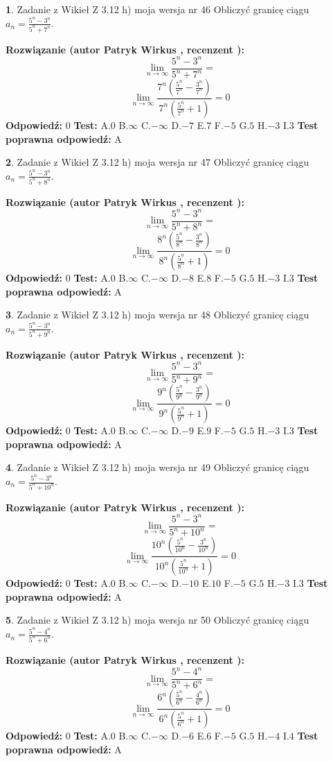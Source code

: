 \documentclass[12pt, a4paper]{article}
\theoremstyle{definition} %
\newtheorem{zad}{}
\newcommand{\zadStart}[1]{\begin{zad}#1\newline}
\newcommand{\zadStop}{\end{zad}}
\newcommand{\rozwStart}[2]{\noindent \textbf{Rozwiązanie (autor #1 , recenzent #2): }\newline}
\newcommand{\rozwStop}{\newline}
\newcommand{\odpStart}{\noindent \textbf{Odpowiedź:}\newline}
\newcommand{\odpStop}{\newline}
\newcommand{\testStart}{\noindent \textbf{Test:}\newline}
\newcommand{\testStop}{\newline}
\newcommand{\kluczStart}{\noindent \textbf{Test poprawna odpowiedź:}\newline}
\newcommand{\kluczStop}{\newline}
\begin{document}
\zadStart{Zadanie z Wikieł Z 3.12 h) moja wersja nr 46}
Obliczyć granicę ciągu $a_{n}=\frac{5^{n} - 3^{n}}{5^{n} + 7^{n}}$.
\zadStop
\rozwStart{Patryk Wirkus}{}
$$\lim\limits_{n\to\infty}\frac{5^{n} - 3^{n}}{5^{n} + 7^{n}}=$$
$$\lim\limits_{n\to\infty}\frac{7^{n}(\frac{5^{n}}{7^{n}} - \frac{3^{n}}{7^{n}})}{7^{n}(\frac{5^{n}}{7^{n}} + 1)} = 0$$
\rozwStop
\odpStart
$0$
\odpStop
\testStart
A.$0$
B.$\infty$
C.$-\infty$
D.$-7$
E.$7$
F.$-5$
G.$5$
H.$-3$
I.$3$
\testStop
\kluczStart
A
\kluczStop



\zadStart{Zadanie z Wikieł Z 3.12 h) moja wersja nr 47}
Obliczyć granicę ciągu $a_{n}=\frac{5^{n} - 3^{n}}{5^{n} + 8^{n}}$.
\zadStop
\rozwStart{Patryk Wirkus}{}
$$\lim\limits_{n\to\infty}\frac{5^{n} - 3^{n}}{5^{n} + 8^{n}}=$$
$$\lim\limits_{n\to\infty}\frac{8^{n}(\frac{5^{n}}{8^{n}} - \frac{3^{n}}{8^{n}})}{8^{n}(\frac{5^{n}}{8^{n}} + 1)} = 0$$
\rozwStop
\odpStart
$0$
\odpStop
\testStart
A.$0$
B.$\infty$
C.$-\infty$
D.$-8$
E.$8$
F.$-5$
G.$5$
H.$-3$
I.$3$
\testStop
\kluczStart
A
\kluczStop



\zadStart{Zadanie z Wikieł Z 3.12 h) moja wersja nr 48}
Obliczyć granicę ciągu $a_{n}=\frac{5^{n} - 3^{n}}{5^{n} + 9^{n}}$.
\zadStop
\rozwStart{Patryk Wirkus}{}
$$\lim\limits_{n\to\infty}\frac{5^{n} - 3^{n}}{5^{n} + 9^{n}}=$$
$$\lim\limits_{n\to\infty}\frac{9^{n}(\frac{5^{n}}{9^{n}} - \frac{3^{n}}{9^{n}})}{9^{n}(\frac{5^{n}}{9^{n}} + 1)} = 0$$
\rozwStop
\odpStart
$0$
\odpStop
\testStart
A.$0$
B.$\infty$
C.$-\infty$
D.$-9$
E.$9$
F.$-5$
G.$5$
H.$-3$
I.$3$
\testStop
\kluczStart
A
\kluczStop



\zadStart{Zadanie z Wikieł Z 3.12 h) moja wersja nr 49}
Obliczyć granicę ciągu $a_{n}=\frac{5^{n} - 3^{n}}{5^{n} + 10^{n}}$.
\zadStop
\rozwStart{Patryk Wirkus}{}
$$\lim\limits_{n\to\infty}\frac{5^{n} - 3^{n}}{5^{n} + 10^{n}}=$$
$$\lim\limits_{n\to\infty}\frac{10^{n}(\frac{5^{n}}{10^{n}} - \frac{3^{n}}{10^{n}})}{10^{n}(\frac{5^{n}}{10^{n}} + 1)} = 0$$
\rozwStop
\odpStart
$0$
\odpStop
\testStart
A.$0$
B.$\infty$
C.$-\infty$
D.$-10$
E.$10$
F.$-5$
G.$5$
H.$-3$
I.$3$
\testStop
\kluczStart
A
\kluczStop



\zadStart{Zadanie z Wikieł Z 3.12 h) moja wersja nr 50}
Obliczyć granicę ciągu $a_{n}=\frac{5^{n} - 4^{n}}{5^{n} + 6^{n}}$.
\zadStop
\rozwStart{Patryk Wirkus}{}
$$\lim\limits_{n\to\infty}\frac{5^{n} - 4^{n}}{5^{n} + 6^{n}}=$$
$$\lim\limits_{n\to\infty}\frac{6^{n}(\frac{5^{n}}{6^{n}} - \frac{4^{n}}{6^{n}})}{6^{n}(\frac{5^{n}}{6^{n}} + 1)} = 0$$
\rozwStop
\odpStart
$0$
\odpStop
\testStart
A.$0$
B.$\infty$
C.$-\infty$
D.$-6$
E.$6$
F.$-5$
G.$5$
H.$-4$
I.$4$
\testStop
\kluczStart
A
\kluczStop
\end{document}
